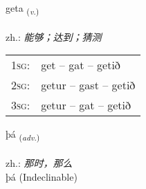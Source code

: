 \documentclass[frontgrid, backgrid]{flacards}\usepackage[]{graphicx}\usepackage[]{xcolor}
\begin{document}
\renewcommand{\blhead}{\vskip5pt {\small\bfseries\footnotesize Sagnorð | 动词 }}
\renewcommand{\bcfoot}{\vskip5pt \hspace{2pt}{\small\bfseries\footnotesize 1K}}


{geta \small{\textsubscript{(\textit{v.})}} \\[1ex] %
\textphonetic{[cɛːta]} \\
zh.: \emph{能够；达到；猜测} \\  [2ex]
\renewcommand*{\arraystretch}{0.8}
\begin{tabular}{p{1cm}l}
\textsc{1sg}: & get -- gat -- getið \\ 
\textsc{2sg}: & getur -- gast -- getið \\ 
\textsc{3sg}: & getur -- gat -- getið \\ 
\end{tabular}
}


\renewcommand{\flhead}{\vskip5pt \fboxsep=0pt {\small\bfseries\footnotesize Atviksorð | 副词}}
\renewcommand{\fcfoot}{\vskip5pt \fboxsep=0pt \hspace{2pt}{\small\bfseries\footnotesize 1K}}

\renewcommand{\blhead}{\vskip5pt {\small\bfseries\footnotesize Atviksorð | 副词 }}
\renewcommand{\bcfoot}{\vskip5pt \hspace{2pt}{\small\bfseries\footnotesize 1K}}


{þá \small{\textsubscript{(\textit{adv.})}} \\[1ex]
\textphonetic{[θauː]} \\
zh.: \emph{那时，那么} \\  [2ex]
þá (Indeclinable)}

\renewcommand{\flhead}{\vskip5pt \fboxsep=0pt {\small\bfseries\footnotesize Sagnorð | 动词}}
\renewcommand{\fcfoot}{\vskip5pt \fboxsep=0pt \hspace{2pt}{\small\bfseries\footnotesize 1K}}

\renewcommand{\blhead}{\vskip5pt {\small\bfseries\footnotesize Sagnorð | 动词 }}
\renewcommand{\bcfoot}{\vskip5pt \hspace{2pt}{\small\bfseries\footnotesize 1K}}
\end{document}

